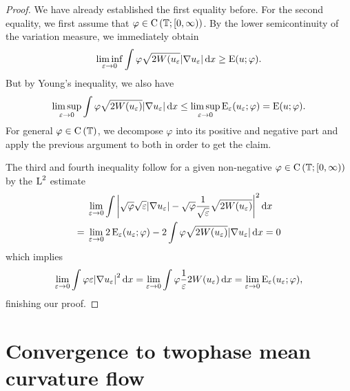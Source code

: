 \begin{proof}
	We have already established the first equality before. For the second equality, we first assume that $ \varphi \in \operatorname{C} \left( \operatorname{\mathbb{T}} ; [ 0 , \infty ) \right)$.
	By the lower semicontinuity of the variation measure, we immediately obtain
	\begin{equation*}
		\liminf_{ \varepsilon \to 0 }
			\int
				\varphi
				\sqrt{ 2 W ( u_{ \varepsilon } }
				\abs{ \nabla u_{ \varepsilon } }
			\dd{ x }
		\geq
		\operatorname{E} ( u ; \varphi ).
	\end{equation*}
	But by Young's inequality, we also have 
	\begin{equation*}
		\limsup_{ \varepsilon \to 0 }
			\int
				\varphi
				\sqrt{ 2 W ( u_{ \varepsilon } ) }
				\abs{ \nabla u_{ \varepsilon } }
			\dd{ x }
		\leq
		\limsup_{ \varepsilon \to 0 }
			\operatorname{E}_{ \varepsilon } ( u_{ \varepsilon } ; \varphi )
		= \operatorname{E} ( u ; \varphi ).
	\end{equation*}
	For general $ \varphi \in \operatorname{C} \left( \operatorname{\mathbb{T}} \right) $, we decompose $ \varphi $ into its positive and negative part and apply the previous argument to both in order to get the claim.
	
	The third and fourth inequality follow for a given non-negative $ \varphi \in \operatorname{C} \left( \operatorname{\mathbb{T}} ; [ 0 , \infty ) \right) $ by the $ \operatorname{L}^{ 2 } $ estimate
	\begin{align*}
		& \lim_{ \varepsilon \to 0 }
			\int
				\abs{ \sqrt{ \varphi } \sqrt{ \varepsilon } \abs{ \nabla u_{ \varepsilon } } - \sqrt{ \varphi } \frac{ 1 }{ \sqrt{ \varepsilon } } \sqrt{ 2 W ( u_{ \varepsilon } ) } }^{ 2 }
			\dd{ x }
		\\
		={} &
		\lim_{ \varepsilon \to 0 }
			2 \operatorname{E}_{ \varepsilon } ( u_{ \varepsilon } ; \varphi )
			-
			2 \int	
				\varphi
				\sqrt{ 2 W ( u_{ \varepsilon } ) }
				\abs{ \nabla u_{ \varepsilon } }
			\dd{ x }
		=
		0
	\end{align*}
	which implies
	\begin{equation*}
		\lim_{ \varepsilon \to 0 }
			\int
				\varphi
				\varepsilon
				\abs{ \nabla u_{ \varepsilon } }^{ 2 }
			\dd{ x }
		=
		\lim_{ \varepsilon \to 0}
			\int
				\varphi
				\frac{ 1 }{ \varepsilon }
				2 W ( u_{ \varepsilon } )
			\dd{ x }
		=
		\lim_{ \varepsilon \to 0 }
		\operatorname{E}_{ \varepsilon } ( u_{ \varepsilon } ; \varphi ),
	\end{equation*}
	finishing our proof.
\end{proof}

\section{Convergence to twophase mean curvature flow}

